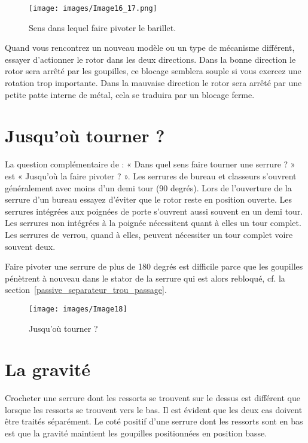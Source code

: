 \documentclass[a4paper,french,11pt,twoside]{report}
\begin{document}
\begin{figure}[ht]
  \begin{center}
    \texttt{[image: images/Image16\_17.png]}
    \caption{Sens dans lequel faire pivoter le barillet.\label{sens_barillet}}
  \end{center}
\end{figure}

Quand vous rencontrez un nouveau modèle ou un type de mécanisme différent, essayer d'actionner le rotor dans les deux directions. Dans la bonne direction le rotor sera arrêté par les goupilles, ce blocage semblera souple si vous exercez une rotation trop importante. Dans la mauvaise direction le rotor sera arrêté par une petite patte interne de métal, cela se traduira par un blocage ferme.

\section{Jusqu'où tourner ?}

La question complémentaire de : « Dans quel sens faire tourner une serrure ? » est « Jusqu'où la faire pivoter ? ». Les serrures de bureau et classeurs s'ouvrent généralement avec moins d'un demi tour (90 degrés). Lors de l'ouverture de la serrure d'un bureau essayez d'éviter que le rotor reste en position ouverte. Les serrures intégrées aux poignées de porte s'ouvrent aussi souvent en un demi tour. Les serrures non intégrées à la poignée nécessitent quant à elles un tour complet. Les serrures de verrou, quand à elles, peuvent nécessiter un tour complet voire souvent deux.

Faire pivoter une serrure de plus de 180 degrés est difficile parce que les goupilles pénètrent à nouveau dans le stator de la serrure qui est alors rebloqué, cf. la section~\ref{passive_separateur_trou_passage}.


\begin{figure}[ht] \begin{center}
        \texttt{[image: images/Image18]}
        \caption{Jusqu'où tourner ?}
\end{center} \end{figure}


\section{La gravité}

Crocheter une serrure dont les ressorts se trouvent sur le dessus est différent que lorsque les ressorts se trouvent vers le bas. Il est évident que les deux cas doivent être traités séparément. Le coté positif d'une serrure dont les ressorts sont en bas est que la gravité maintient les goupilles positionnées en position basse.
\end{document}
